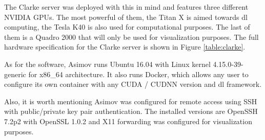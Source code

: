 The Clarke server was deployed with this in mind and features three different NVIDIA GPUs. The most powerful of them, the Titan X is aimed towards \gls{dl} computing, the Tesla K40 is also used for computational purposes. The last of them is a Quadro 2000 that will only be used for visualization purposes. The full hardware specification for the Clarke server is shown in Figure \ref{table:clarke}.

As for the software, Asimov runs Ubuntu 16.04 with Linux kernel 4.15.0-39-generic for x86\_64 architecture. It also runs Docker, which allows any user to configure its own container with any CUDA / CUDNN version and \gls{dl} framework.

Also, it is worth mentioning  Asimov was configured for remote access using SSH with public/private key pair authentication. The installed versions are OpenSSH 7.2p2 with OpenSSL 1.0.2 and X11 forwarding was configured for visualization purposes.

